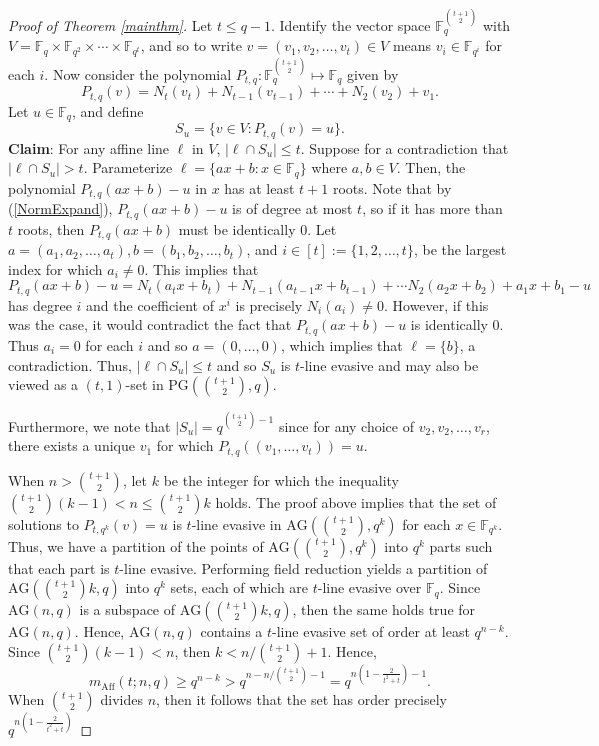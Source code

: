 \documentclass[10pt,a4paper]{amsart}
\newcommand{\AG}{\text{AG}}
\newcommand{\F}{\mathbb{F}}
\newcommand{\PG}{\text{PG}}
\newcommand{\mpa}[3]{m_{\text{Aff}}(#1 ; #2, #3)}
\begin{document}
\begin{proof}[Proof of Theorem \ref{mainthm}]
Let $t \leq q-1$. Identify the vector space $\F_q^{\binom{t+1}{2}}$ with $V = \F_q \times \F_{q^2}\times \cdots \times\F_{q^{t}}$, and so to write $v = (v_1, v_2, \dots, v_{t}) \in V$ means $v_i \in \F_{q^i}$ for each $i$. Now consider the polynomial $P_{t, q}: \F_q^{\binom{t+1}{2}} \mapsto \F_q$ given by
$$
P_{t, q}(v) = N_{t}(v_{t}) + N_{t-1}(v_{t-1}) + \cdots + N_2(v_2) + v_1.
$$
Let $u \in \F_q$, and define 
$$
S_u = \{ v \in V: P_{t, q}(v) = u\}.
$$
\noindent \textbf{Claim}: For any affine line $\ell$ in $V$, $|\ell \cap S_u | \leq t$. 
Suppose for a contradiction that $|\ell \cap S_u| > t$. Parameterize $\ell = \{ ax + b: x\in \F_q \}$ where $a, b \in V$. Then, the polynomial $P_{t, q}(ax + b) - u$
in $x$ has at least $t+1$ roots. Note that by (\ref{NormExpand}), $P_{t, q}(ax + b) - u$ is of degree at most $t$, so if it has more than $t$ roots, then $P_{t, q}(ax + b)$ must be identically 0. Let $a = (a_1, a_2, \dots, a_{t}), b = (b_1, b_2, \dots, b_t)$, and $i \in [t] := \{ 1, 2, \dots, t \}$, be the largest index for which $a_i \neq 0$. This implies that
$$
P_{t, q}(ax + b) - u = N_t(a_tx + b_t) + N_{t-1}(a_{t-1}x + b_{t-1}) + \cdots N_2(a_2x + b_2) + a_1x + b_1-u
$$
has degree $i$ and the coefficient of $x^i$ is precisely $N_i(a_i) \neq 0$. However, if this was the case, it would contradict the fact that $P_{t, q}(ax + b) - u$ is identically 0. Thus $a_i =0$ for each $i$ and so $a = (0, \dots, 0)$, which implies that $\ell = \{ b\}$, a contradiction. Thus, $|\ell \cap S_u| \leq t$ and so $S_u$ is $t$-line evasive and may also be viewed as a $(t,1)$-set in $\PG(\binom{t + 1}{2}, q)$.

Furthermore, we note that $|S_u| = q^{\binom{t+1}{2}- 1}$ since for any choice of $v_2, v_2, \dots, v_{r}$, there exists a unique $v_1$ for which $P_{t, q}((v_1, \dots, v_{t})) = u$.


When $n > \binom{t+1}{2}$, let $k$ be the integer for which the inequality $\binom{t+1}{2}(k-1) <n \leq \binom{t+1}{2}k$ holds. The proof above implies that the set of solutions to $P_{t, q^k}(v) = u$ is $t$-line evasive in $\AG(\binom{t+1}{2}, q^k)$ for each $x \in \F_{q^k}$. Thus, we have a partition of the points of $\AG(\binom{t+1}{2}, q^k)$ into $q^k$ parts such that each part is $t$-line evasive. Performing field reduction yields a partition of $\AG(\binom{t+1}{2}k, q)$ into $q^k$ sets, each of which are $t$-line evasive over $\F_q$. Since $\AG(n, q)$ is a subspace of $\AG(\binom{t+1}{2}k, q)$, then the same holds true for $\AG(n, q)$. Hence, $\AG(n, q)$ contains a $t$-line evasive set of order at least $q^{n-k}$. Since $\binom{t+1}{2}(k-1) < n $, then $k < n/ \binom{t+1}{2} + 1$. Hence, 
$$
\mpa{t}{n}{q} \geq q^{n - k} > q^{n - n/\binom{t+1}{2} - 1} = q^{n\left( 1 - \frac{2}{t^2 + t} \right) - 1}.
$$
When $\binom{t+1}{2}$ divides $n$, then it follows that the set has order precisely $q^{n\left( 1 - \frac{2}{t^2 + t} \right)}$
\end{proof}
\end{document}

